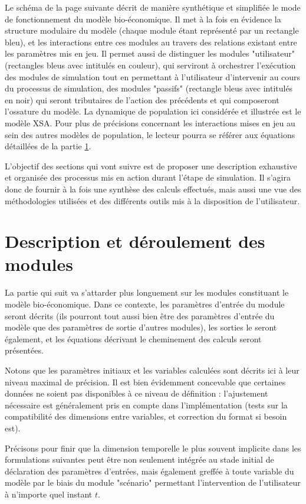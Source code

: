 \documentclass[12pt, colorinlistoftodos, notitlepage]{report}
\newenvironment{not used}[1]{%
    \longtable{%
        |>{\centering$\displaystyle}A{#1}{1}<{$}%
        |}\hline\ignorespaces}{%
    \endlongtable\ignorespacesafterend}
\begin{document}
Le schéma de la page suivante décrit de manière synthétique et simplifiée le mode de fonctionnement du modèle bio-économique. Il met à la fois en évidence la structure modulaire du modèle (chaque module étant représenté par un rectangle bleu), et les interactions entre ces modules au travers des relations existant entre les paramètres mis en jeu. Il permet aussi de distinguer les modules "utilisateur" (rectangles bleus avec intitulés en couleur), qui serviront à orchestrer l'exécution des modules de simulation tout en permettant à l'utilisateur d'intervenir au cours du processus de simulation, des modules "passifs" (rectangle bleus avec intitulés en noir) qui seront tributaires de l'action des précédents et qui composeront l'ossature du modèle. La dynamique de population ici considérée et illustrée est le modèle XSA. Pour plus de précisions concernant les interactions mises en jeu au sein des autres modèles de population, le lecteur pourra se référer aux équations détaillées de la partie \ref{sec:module}.

L'objectif des sections qui vont suivre est de proposer une description exhaustive et organisée des processus mis en action durant l'étape de simulation. Il s'agira donc de fournir à la fois une synthèse des calculs effectués, mais aussi une vue des méthodologies utilisées et des différents outils mis à la disposition de l'utilisateur.


\section{Description et déroulement des modules} \label{sec:module}

La partie qui suit va s'attarder plus longuement sur les modules constituant le modèle bio-économique. Dans ce contexte, les paramètres d'entrée du module seront décrits (ils pourront tout aussi bien être des paramètres d'entrée du modèle que des paramètres de sortie d'autres modules), les sorties le seront également, et les équations décrivant le cheminement des calculs seront présentées. 

Notons que les paramètres initiaux et les variables calculées sont décrits ici à leur niveau maximal de précision. Il est bien évidemment concevable que certaines données ne soient pas disponibles à ce niveau de définition : l’ajustement nécessaire est généralement pris en compte dans l’implémentation (tests sur la compatibilité des dimensions entre variables, et correction du format si besoin est).

Précisons pour finir que la dimension temporelle le plus souvent implicite dans les formulations suivantes peut être non seulement intégrée au stade initial de déclaration des paramètres d’entrées, mais également greffée à toute variable du modèle par le biais du module "scénario" permettant l'intervention de l'utilisateur à n'importe quel instant $t$.
\end{document}

